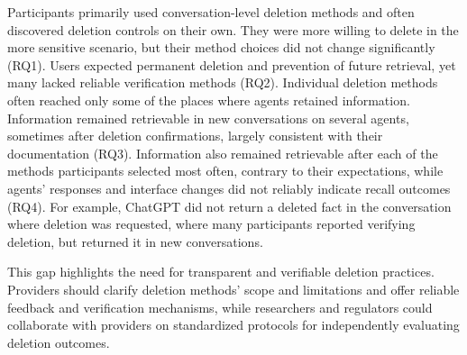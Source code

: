 Participants primarily used conversation-level deletion methods and often discovered deletion controls on their own.
%
They were more willing to delete in the more sensitive scenario, but their method choices did not change significantly (RQ1).
%
Users expected permanent deletion and prevention of future retrieval, yet many lacked reliable verification methods (RQ2).
%
Individual deletion methods often reached only some of the places where agents retained information.
%
Information remained retrievable in new conversations on several agents, sometimes after deletion confirmations, largely consistent with their documentation (RQ3).
%
Information also remained retrievable after each of the methods participants selected most often, contrary to their expectations, while agents' responses and interface changes did not reliably indicate recall outcomes (RQ4).
%
For example, ChatGPT did not return a deleted fact in the conversation where deletion was requested, where many participants reported verifying deletion, but returned it in new conversations.

This gap highlights the need for transparent and verifiable deletion practices.
%
Providers should clarify deletion methods' scope and limitations and offer reliable feedback and verification mechanisms, while researchers and regulators could collaborate with providers on standardized protocols for independently evaluating deletion outcomes.

